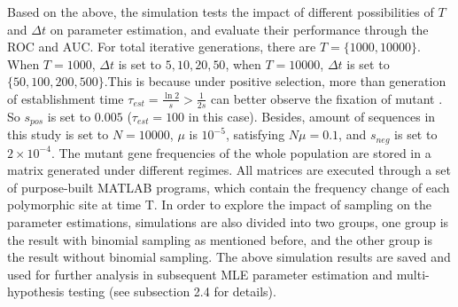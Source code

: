 \documentclass[12pt]{article}
\begin{document}
Based on the above, the simulation tests the impact of different possibilities of $T$ and $\Delta t$ on parameter estimation, and evaluate their performance through the ROC and AUC. For total iterative generations, there are $T=\{1000,10000\}$. When $T=1000$, $\Delta t$ is set to ${5, 10, 20, 50}$, when $T=10000$, $\Delta t$ is set to $\{50, 100, 200, 500\}$.This is because under positive selection, more than generation of establishment time $\tau_{est}= \frac{\ln 2}{s} >\frac{1}{2s}$ can better observe the fixation of mutant \citep{desai2007beneficial}. So $s_{pos}$ is set to $0.005$ ($\tau_{est}=100$ in this case). Besides, amount of sequences in this study is set to $N=10000$, $\mu$ is $10^{-5}$, satisfying $N\mu=0.1$, and $s_{neg}$ is set to $2 \times 10^{-4}$. The mutant gene frequencies of the whole population are stored in a matrix generated under different regimes. All matrices are executed through a set of purpose-built MATLAB programs, which contain the frequency change of each polymorphic site at time T. In order to explore the impact of sampling on the parameter estimations, simulations are also divided into two groups, one group is the result with binomial sampling as mentioned before, and the other group is the result without binomial sampling. The above simulation results are saved and used for further analysis in  subsequent MLE parameter estimation and multi-hypothesis testing (see subsection 2.4 for details).\\
\end{document}
